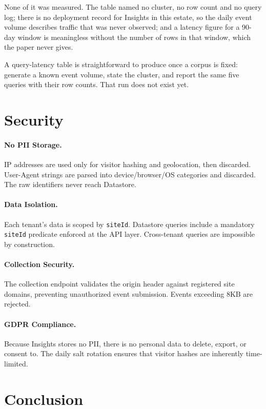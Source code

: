 \documentclass[11pt,twocolumn]{article}
\begin{document}
None of it was measured. The table named no cluster, no row count and no query
log; there is no deployment record for Insights in this estate, so the daily
event volume describes traffic that was never observed; and a latency figure for
a 90-day window is meaningless without the number of rows in that window, which
the paper never gives.

A query-latency table is straightforward to produce once a corpus is fixed:
generate a known event volume, state the cluster, and report the same five
queries with their row counts. That run does not exist yet.

\section{Security}

\paragraph{No PII Storage.} IP addresses are used only for visitor hashing and geolocation, then discarded. User-Agent strings are parsed into device/browser/OS categories and discarded. The raw identifiers never reach Datastore.

\paragraph{Data Isolation.} Each tenant's data is scoped by \texttt{siteId}. Datastore queries include a mandatory \texttt{siteId} predicate enforced at the API layer. Cross-tenant queries are impossible by construction.

\paragraph{Collection Security.} The collection endpoint validates the origin header against registered site domains, preventing unauthorized event submission. Events exceeding 8KB are rejected.

\paragraph{GDPR Compliance.} Because Insights stores no PII, there is no personal data to delete, export, or consent to. The daily salt rotation ensures that visitor hashes are inherently time-limited.

\section{Conclusion}
\end{document}
